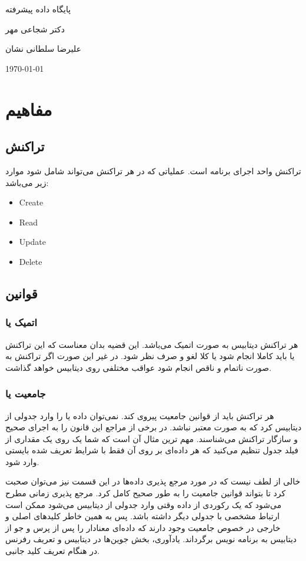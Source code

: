 \documentclass[a4paper]{article}
\begin{document}
\centerline{پایگاه داده پیشرفته}
\centerline{دکتر شجاعی مهر}
\centerline{علیرضا سلطانی نشان}
\centerline{\today}
\tableofcontents

\newpage

\section{مفاهیم}

\subsection{تراکنش}

تراکنش واحد اجرای برنامه است. عملیاتی که در هر تراکنش می‌تواند شامل شود موارد
زیر می‌باشد:

\begin{itemize}
    \item Create
    \item Read
    \item Update
    \item Delete
\end{itemize}

\subsection{قوانین }

\subsubsection{اتمیک یا }

هر تراکنش دیتابیس به صورت اتمیک می‌باشد. این قضیه بدان معناست که این تراکنش یا
باید کاملا انجام شود یا کلا لغو و صرف نظر شود. در غیر این صورت اگر تراکنش به
صورت ناتمام و ناقص انجام شود عواقب مختلفی روی دیتابیس خواهد گذاشت.

\subsubsection{جامعیت یا }

هر تراکنش باید از قوانین جامعیت پیروی کند. نمی‌توان داده یا را وارد جدولی از
دیتابیس کرد که به صورت معتبر نباشد. در برخی از مراجع این قانون را به اجرای صحیح
و سازگار تراکنش می‌شناسند. مهم ترین مثال آن است که شما یک  روی یک
مقداری از فیلد جدول تنظیم می‌کنید که هر داده‌ای بر روی آن فقط با شرایط تعریف شده
بایستی وارد شود.

خالی از لطف نیست که در مورد مرجع پذیری داده‌ها در این قسمت نیز می‌توان صحبت کرد
تا بتواند قوانین جامعیت را به طور صحیح کامل کرد. مرجع پذیری زمانی مطرح می‌شود که
یک رکوردی از داده وقتی وارد جدولی از دیتابیس می‌شود ممکن است ارتباط مشخصی با
جدولی دیگر داشته باشد. پس به همین خاطر کلید‌های اصلی و خارجی در خصوص جامعیت وجود
دارند که داده‌ای معنادار را پس از پرس و جو از دیتابیس به برنامه نویس برگرداند.
یادآوری، بخش جوین‌ها در دیتابیس و تعریف رفرنس در هنگام تعریف کلید جانبی.
\end{document}
